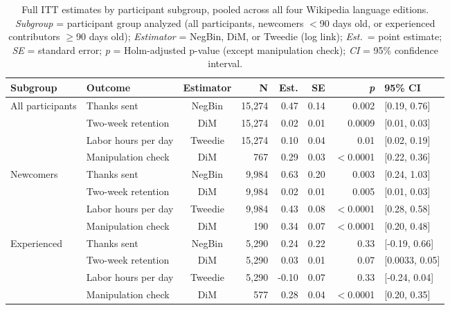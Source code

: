 \begin{table}[ht]
\centering
\small
\caption{Full ITT estimates by participant subgroup, pooled across all four Wikipedia language editions. \textit{Subgroup} = participant group analyzed (all participants, newcomers $<$90 days old, or experienced contributors $\geq$90 days old); \textit{Estimator} = NegBin, DiM, or Tweedie (log link); \textit{Est.}\ = point estimate; \textit{SE} = standard error; \textit{p} = Holm-adjusted p-value (except manipulation check); \textit{CI} = 95\% confidence interval.}
\label{table:full_itt_subgroup}
\begin{tabular}{llcrrrrl}
\toprule
\textbf{Subgroup} & \textbf{Outcome} & \textbf{Estimator} & \textbf{N} & \textbf{Est.} & \textbf{SE} & \textbf{\textit{p}} & \textbf{95\% CI} \\
\midrule
All participants & Thanks sent & NegBin & 15,274 & 0.47 & 0.14 & 0.002 & [0.19, 0.76] \\
 & Two-week retention & DiM & 15,274 & 0.02 & 0.01 & 0.0009 & [0.01, 0.03] \\
 & Labor hours per day & Tweedie & 15,274 & 0.10 & 0.04 & 0.01 & [0.02, 0.19] \\
 & Manipulation check & DiM & 767 & 0.29 & 0.03 & $<$0.0001 & [0.22, 0.36] \\
\addlinespace
Newcomers & Thanks sent & NegBin & 9,984 & 0.63 & 0.20 & 0.003 & [0.24, 1.03] \\
 & Two-week retention & DiM & 9,984 & 0.02 & 0.01 & 0.005 & [0.01, 0.03] \\
 & Labor hours per day & Tweedie & 9,984 & 0.43 & 0.08 & $<$0.0001 & [0.28, 0.58] \\
 & Manipulation check & DiM & 190 & 0.34 & 0.07 & $<$0.0001 & [0.20, 0.48] \\
\addlinespace
Experienced & Thanks sent & NegBin & 5,290 & 0.24 & 0.22 & 0.33 & [-0.19, 0.66] \\
 & Two-week retention & DiM & 5,290 & 0.03 & 0.01 & 0.07 & [0.0033, 0.05] \\
 & Labor hours per day & Tweedie & 5,290 & -0.10 & 0.07 & 0.33 & [-0.24, 0.04] \\
 & Manipulation check & DiM & 577 & 0.28 & 0.04 & $<$0.0001 & [0.20, 0.35] \\
\bottomrule
\end{tabular}
\end{table}
